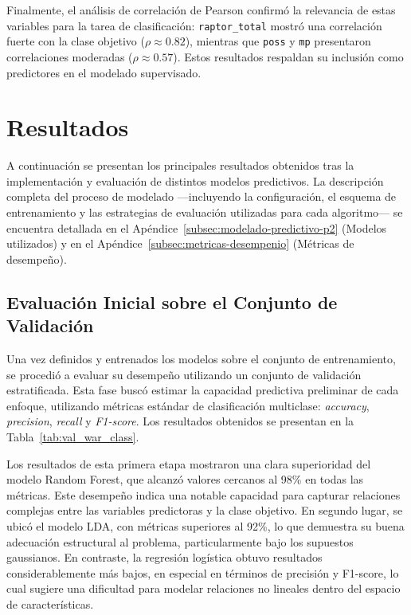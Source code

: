 \begin{multicols}{2}
Finalmente, el análisis de correlación de Pearson confirmó la relevancia de estas variables para la tarea de clasificación: \texttt{raptor\_total} mostró una correlación fuerte con la clase objetivo (\(\rho \approx 0.82\)), mientras que \texttt{poss} y \texttt{mp} presentaron correlaciones moderadas (\(\rho \approx 0.57\)). Estos resultados respaldan su inclusión como predictores en el modelado supervisado.



\section{Resultados}
A continuación se presentan los principales resultados obtenidos tras la implementación y evaluación de distintos modelos predictivos. La descripción completa del proceso de modelado —incluyendo la configuración, el esquema de entrenamiento y las estrategias de evaluación utilizadas para cada algoritmo— se encuentra detallada en el Apéndice~\ref{subsec:modelado-predictivo-p2} (Modelos utilizados) y en el Apéndice~\ref{subsec:metricas-desempenio} (Métricas de desempeño).



\subsection{Evaluación Inicial sobre el Conjunto de Validación}

Una vez definidos y entrenados los modelos sobre el conjunto de entrenamiento, se procedió a evaluar su desempeño utilizando un conjunto de validación estratificada. Esta fase buscó estimar la capacidad predictiva preliminar de cada enfoque, utilizando métricas estándar de clasificación multiclase: \textit{accuracy}, \textit{precision}, \textit{recall} y \textit{F1-score}. Los resultados obtenidos se presentan en la Tabla~\ref{tab:val_war_class}.


Los resultados de esta primera etapa mostraron una clara superioridad del modelo Random Forest, que alcanzó valores cercanos al 98\% en todas las métricas. Este desempeño indica una notable capacidad para capturar relaciones complejas entre las variables predictoras y la clase objetivo. En segundo lugar, se ubicó el modelo LDA, con métricas superiores al 92\%, lo que demuestra su buena adecuación estructural al problema, particularmente bajo los supuestos gaussianos. En contraste, la regresión logística obtuvo resultados considerablemente más bajos, en especial en términos de precisión y F1-score, lo cual sugiere una dificultad para modelar relaciones no lineales dentro del espacio de características.


\end{multicols}
